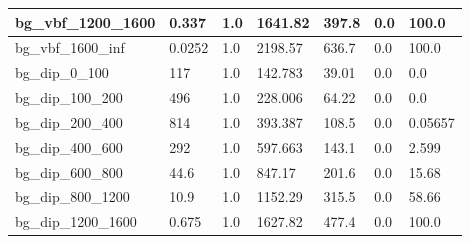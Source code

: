 \documentclass[a4paper, 10pt]{article}
\begin{document}
\begin{table}[H]
\begin{center}
\begin{tabular}{|m{23.0mm}|m{23.0mm}|m{18.0mm}|m{19.0mm}|m{19.0mm}|m{19.0mm}|m{19.0mm}|}
      \hline
      {\cellcolor{white}         bg\_vbf\_1200\_1600}& {\cellcolor{white}         0.337}& {\cellcolor{white}         1.0}& {\cellcolor{white}         1641.82}& {\cellcolor{white}         397.8}& {\cellcolor{red}         0.0}& {\cellcolor{red}         100.0}\\
      \hline
      {\cellcolor{white}         bg\_vbf\_1600\_inf}& {\cellcolor{white}         0.0252}& {\cellcolor{white}         1.0}& {\cellcolor{white}         2198.57}& {\cellcolor{white}         636.7}& {\cellcolor{red}         0.0}& {\cellcolor{red}         100.0}\\
      \hline
      {\cellcolor{white}         bg\_dip\_0\_100}& {\cellcolor{white}         117}& {\cellcolor{white}         1.0}& {\cellcolor{white}         142.783}& {\cellcolor{white}         39.01}& {\cellcolor{green}         0.0}& {\cellcolor{green}         0.0}\\
      \hline
      {\cellcolor{white}         bg\_dip\_100\_200}& {\cellcolor{white}         496}& {\cellcolor{white}         1.0}& {\cellcolor{white}         228.006}& {\cellcolor{white}         64.22}& {\cellcolor{green}         0.0}& {\cellcolor{green}         0.0}\\
      \hline
      {\cellcolor{white}         bg\_dip\_200\_400}& {\cellcolor{white}         814}& {\cellcolor{white}         1.0}& {\cellcolor{white}         393.387}& {\cellcolor{white}         108.5}& {\cellcolor{green}         0.0}& {\cellcolor{green}         0.05657}\\
      \hline
      {\cellcolor{white}         bg\_dip\_400\_600}& {\cellcolor{white}         292}& {\cellcolor{white}         1.0}& {\cellcolor{white}         597.663}& {\cellcolor{white}         143.1}& {\cellcolor{green}         0.0}& {\cellcolor{green}         2.599}\\
      \hline
      {\cellcolor{white}         bg\_dip\_600\_800}& {\cellcolor{white}         44.6}& {\cellcolor{white}         1.0}& {\cellcolor{white}         847.17}& {\cellcolor{white}         201.6}& {\cellcolor{red}         0.0}& {\cellcolor{red}         15.68}\\
      \hline
      {\cellcolor{white}         bg\_dip\_800\_1200}& {\cellcolor{white}         10.9}& {\cellcolor{white}         1.0}& {\cellcolor{white}         1152.29}& {\cellcolor{white}         315.5}& {\cellcolor{red}         0.0}& {\cellcolor{red}         58.66}\\
      \hline
      {\cellcolor{white}         bg\_dip\_1200\_1600}& {\cellcolor{white}         0.675}& {\cellcolor{white}         1.0}& {\cellcolor{white}         1627.82}& {\cellcolor{white}         477.4}& {\cellcolor{red}         0.0}& {\cellcolor{red}         100.0}\\

\end{tabular}
\end{center}
\end{table}
\end{document}
